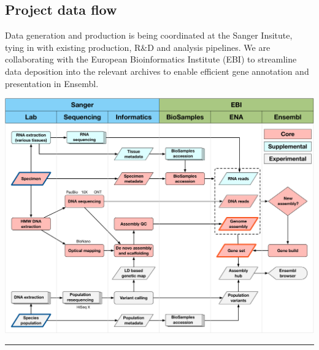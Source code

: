 \documentclass[a0,portrait]{a0poster}
\begin{document}
\begin{multicols}{2}

\section*{Project data flow}

Data generation and production is being coordinated at the Sanger Insitute, tying in with existing production, R\&D and analysis pipelines. We are collaborating with the European Bioinformatics Institute (EBI) to streamline data deposition into the relevant archives to enable efficient gene annotation and presentation in Ensembl.

\vspace{0.5cm}

\begin{center}
\captionsetup{type=figure}
\includegraphics[width=0.9\linewidth]{images/flow.pdf}
\end{center}

\end{multicols}

\begin{center}\noindent\rule{1.0\linewidth}{0.05pt}\end{center}
\end{document}
